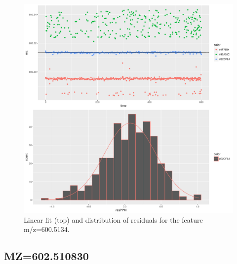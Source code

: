 \documentclass[]{article}
\begin{document}
\begin{figure}[H]
\begin{center}
\includegraphics{Supplementary_document_files/figure-latex/filter.lm.600-1.pdf}
\caption{Linear fit (top) and distribution of residuals for the  feature m/z=600.5134.}
\label{ig:chk.mz.600.5134}
\end{center}
\end{figure}


\subsection{MZ=602.510830}\label{mz602.510830}
\end{document}
